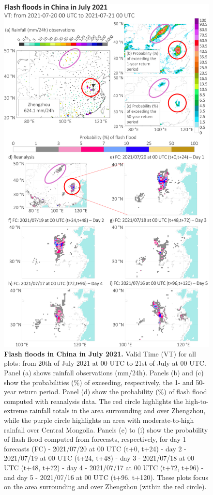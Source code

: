 \begin{figure}[htbp]
\centering
\includegraphics[scale = 0.9]{case_study_china.png}
\caption{\textbf{Flash floods in China in July 2021.} Valid Time (VT) for all plots: from 20th of July 2021 at 00 UTC to 21st of July at 00 UTC. Panel (a) shows rainfall observations (mm/24h). Panels (b) and (c) show the probabilities (\%) of exceeding, respectively, the 1- and 50-year return period. Panel (d) show the probability (\%) of flash flood computed with reanalysis data. The red circle highlights the high-to-extreme rainfall totals in the area surrounding and over Zhengzhou, while the purple circle highlights an area with moderate-to-high rainfall over Central Mongolia. Panels (e) to (i) show the probability of flash flood computed from forecasts, respectively, for day 1 forecasts (FC) - 2021/07/20 at 00 UTC (t+0, t+24) - day 2 - 2021/07/19 at 00 UTC (t+24, t+48) - day 3 - 2021/07/18 at 00 UTC (t+48, t+72) - day 4 - 2021/07/17 at 00 UTC (t+72, t+96) - and day 5 - 2021/07/16 at 00 UTC (t+96, t+120). These plots focus on the area surrounding and over Zhengzhou (within the red circle).}
\label{fig:case_study_china}
\end{figure}


